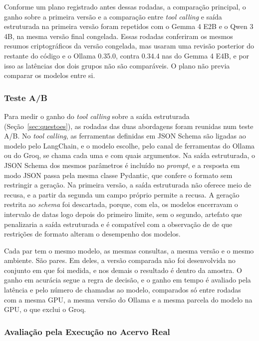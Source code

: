 Conforme um plano registrado antes dessas rodadas, a comparação principal, o ganho sobre a primeira versão e a comparação entre \textit{tool calling} e saída estruturada na primeira versão foram repetidos com o Gemma 4 E2B e o Qwen 3 4B, na mesma versão final congelada. Essas rodadas conferiram os mesmos resumos criptográficos da versão congelada, mas usaram uma revisão posterior do restante do código e o Ollama 0.35.0, contra 0.34.4 nas do Gemma 4 E4B, e por isso as latências dos dois grupos não são comparáveis. O plano não previa comparar os modelos entre si.

\subsubsection{Teste A/B}
\label{sec:metodo-ab}

Para medir o ganho do \textit{tool calling} sobre a saída estruturada (Seção~\ref{sec:questoes}), as rodadas das duas abordagens foram reunidas num teste A/B. No \textit{tool calling}, as ferramentas definidas em JSON Schema são ligadas ao modelo pelo LangChain, e o modelo escolhe, pelo canal de ferramentas do Ollama ou do Groq, se chama cada uma e com quais argumentos. Na saída estruturada, o JSON Schema dos mesmos parâmetros é incluído no \textit{prompt}, e a resposta em modo JSON passa pela mesma classe Pydantic, que confere o formato sem restringir a geração. Na primeira versão, a saída estruturada não oferece meio de recusa, e a partir da segunda um campo próprio permite a recusa. A geração restrita ao \textit{schema} foi descartada, porque, com ela, os modelos encerravam o intervalo de datas logo depois do primeiro limite, sem o segundo, artefato que penalizaria a saída estruturada e é compatível com a observação de  de que restrições de formato alteram o desempenho dos modelos.

Cada par tem o mesmo modelo, as mesmas consultas, a mesma versão e o mesmo ambiente. São  pares. Em  deles, a versão comparada não foi desenvolvida no conjunto em que foi medida, e nos demais o resultado é dentro da amostra. O ganho em acurácia segue a regra de decisão, e o ganho em tempo é avaliado pela latência e pelo número de chamadas ao modelo, comparados só entre rodadas com a mesma GPU, a mesma versão do Ollama e a mesma parcela do modelo na GPU, o que exclui o Groq.

\subsubsection{Avaliação pela Execução no Acervo Real}
\label{sec:metodo-execucao}

